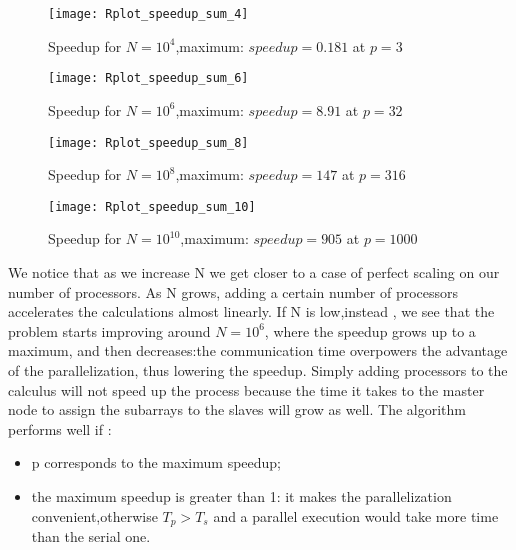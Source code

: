 \documentclass[11pt]{scrartcl} %
\begin{document}
\begin{figure}[H] %
	\centering
	\texttt{[image: Rplot\_speedup\_sum\_4]} %
	\caption{Speedup for $N=10^4$,maximum: $speedup = 0.181$ at $p = 3$}
\end{figure}
\begin{figure}[H] %
	\centering
	\texttt{[image: Rplot\_speedup\_sum\_6]} %
	\caption{Speedup for $N=10^6$,maximum: $speedup = 8.91$ at $p = 32$}
\end{figure}
\begin{figure}[H] %
	\centering
	\texttt{[image: Rplot\_speedup\_sum\_8]} %
	\caption{Speedup for $N=10^8$,maximum: $speedup = 147$ at $p = 316$}
\end{figure}
\begin{figure}[H] %
	\centering
	\texttt{[image: Rplot\_speedup\_sum\_10]} %
	\caption{Speedup for $N=10^{10}$,maximum: $speedup = 905$ at $p = 1000$}
\end{figure}

We notice that as we increase N we get closer to a case of perfect scaling on our number of processors. As N grows, adding a certain number of processors accelerates the calculations almost linearly.
If N is low,instead , we see that the problem starts improving around $N=10^6$, where the speedup grows up to a maximum, and then decreases:the communication time overpowers the advantage of the parallelization, thus lowering the speedup.
 Simply adding processors to the calculus will not speed up the process because the time it takes to the master node to assign the subarrays to the slaves will grow as well.
The algorithm performs well if :
\begin{itemize}
	\item p corresponds to the maximum speedup;
	\item the maximum speedup is greater than 1: it makes the parallelization convenient,otherwise $T_p>T_s$ and a parallel execution would take more time than the serial one.
\end{itemize}
\end{document}
